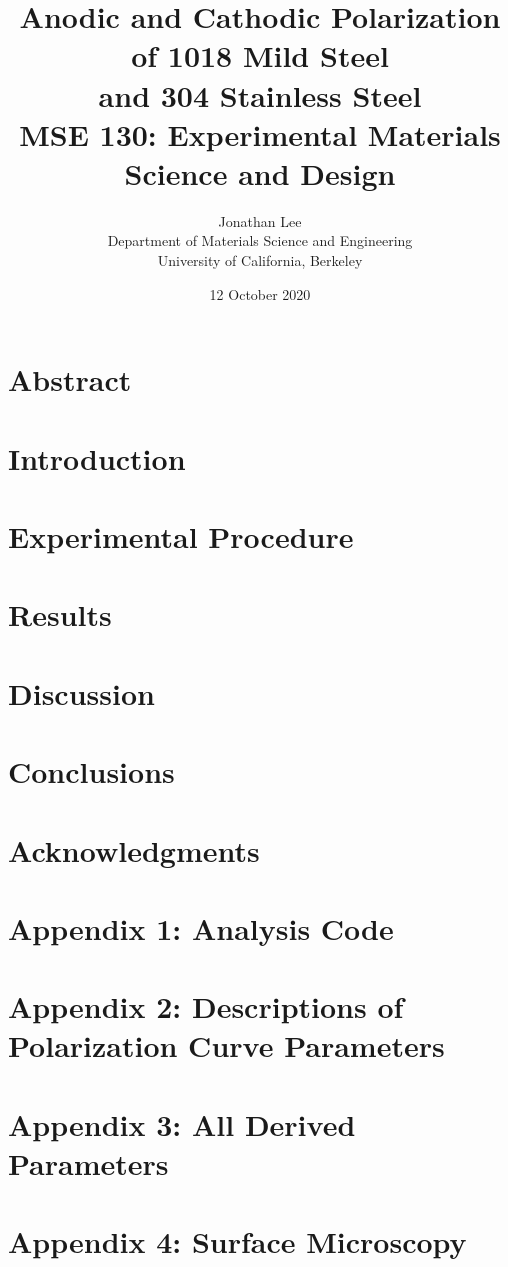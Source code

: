 \documentclass[12pt, titlepage]{article}
\title{\Large Anodic and Cathodic Polarization of 1018 Mild Steel \\
		and 304 Stainless Steel \\
		\bigskip
	\normalsize MSE 130: Experimental Materials Science and Design}
\author{\normalsize Jonathan Lee \\
	\normalsize Department of Materials Science and Engineering \\
	\normalsize University of California, Berkeley}
\date{\normalsize 12 October 2020}
\begin{document}
\maketitle

\doublespacing

\setcounter{page}{2}

\tableofcontents

\newpage

\section{Abstract}

\section{Introduction}



\section{Experimental Procedure}





\section{Results}



\section{Discussion}



\section{Conclusions}

\section{Acknowledgments}


\section{Appendix 1: Analysis Code}
\section{Appendix 2: Descriptions of Polarization Curve Parameters}



\section{Appendix 3: All Derived Parameters}

\section{Appendix 4: Surface Microscopy}
\end{document}
